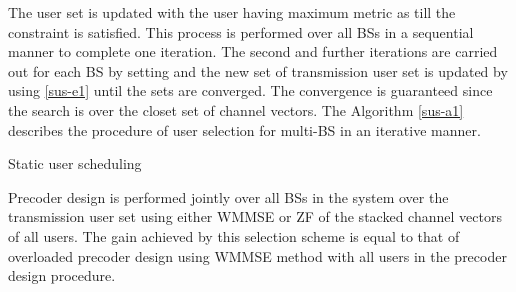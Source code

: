 The user set  is updated with the user having maximum metric  as  till the constraint  is satisfied. This process is performed over all BSs in a sequential manner to complete one iteration. The second and further iterations are carried out for each BS  by setting  and the new set of transmission user set  is updated by using \eqref{sus-e1} until the sets are converged. The convergence is guaranteed since the search is over the closet set of channel vectors. The Algorithm \ref{sus-a1} describes the procedure of user selection for multi-BS in an iterative manner.
\begin{algorithm}
 \SetAlgoLined
 \DontPrintSemicolon
 \caption{Static user scheduling}
 \label{sus-a1}
\end{algorithm}

Precoder design is performed jointly over all BSs in the system over the transmission user set  using either WMMSE \cite{wmmse_shi} or ZF of the stacked channel vectors of all users. The gain achieved by this selection scheme is equal to that of overloaded precoder design using WMMSE method with all users in the precoder design procedure.
